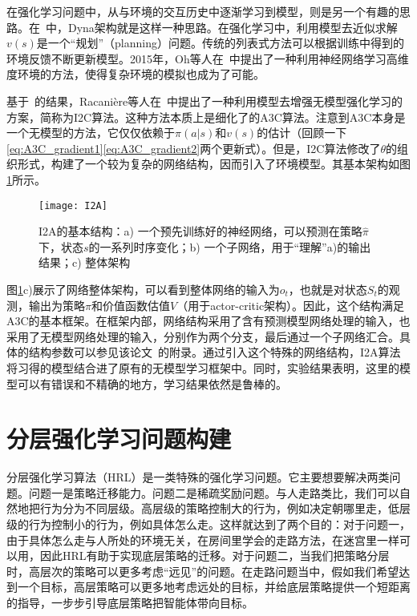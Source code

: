      在强化学习问题中，从与环境的交互历史中逐渐学习到模型，则是另一个有趣的思路。在~中，Dyna架构就是这样一种思路。在强化学习中，利用模型去近似求解$v(s)$是一个``规划''（planning）问题。传统的列表式方法可以根据训练中得到的环境反馈不断更新模型。2015年，Oh等人在~中提出了一种利用神经网络学习高维度环境的方法，使得复杂环境的模拟也成为了可能。\par 
      基于~\cite{action-conditional_prediction}的结果，Racani\`{e}re等人在~中提出了一种利用模型去增强无模型强化学习的方案，简称为I2C算法。这种方法本质上是细化了的A3C算法。注意到A3C本身是一个无模型的方法，它仅仅依赖于$\pi(a|s)$和$v(s)$的估计（回顾一下\eqref{eq:A3C_gradient1}\eqref{eq:A3C_gradient2}两个更新式）。但是，I2C算法修改了$\theta$的组织形式，构建了一个较为复杂的网络结构，因而引入了环境模型。其基本架构如图\ref{fig:I2A}所示。
      \begin{figure}[H] %
        \centering
        \texttt{[image: I2A]}
        \caption{I2A的基本结构：a) 一个预先训练好的神经网络，可以预测在策略$\hat{\pi}$下，状态$s$的一系列时序变化；b) 一个子网络，用于``理解''a)的输出结果；c) 整体架构}
        \label{fig:I2A}
      \end{figure}
      \par 图\ref{fig:I2A}c)展示了网络整体架构，可以看到整体网络的输入为$o_t$，也就是对状态$S_t$的观测，输出为策略$\pi$和价值函数估值$V$（用于actor-critic架构）。因此，这个结构满足A3C的基本框架。在框架内部，网络结构采用了含有预测模型网络处理的输入，也采用了无模型网络处理的输入，分别作为两个分支，最后通过一个子网络汇合。具体的结构参数可以参见该论文~\cite{I2A}的附录。通过引入这个特殊的网络结构，I2A算法将习得的模型结合进了原有的无模型学习框架中。同时，实验结果表明，这里的模型可以有错误和不精确的地方，学习结果依然是鲁棒的。
    
\section{分层强化学习问题构建}
分层强化学习算法（HRL）是一类特殊的强化学习问题。它主要想要解决两类问题。问题一是策略迁移能力。问题二是稀疏奖励问题。与人走路类比，我们可以自然地把行为分为不同层级。高层级的策略控制大的行为，例如决定朝哪里走，低层级的行为控制小的行为，例如具体怎么走。这样就达到了两个目的：对于问题一，由于具体怎么走与人所处的环境无关，在房间里学会的走路方法，在迷宫里一样可以用，因此HRL有助于实现底层策略的迁移。对于问题二，当我们把策略分层时，高层次的策略可以更多考虑``远见''的问题。在走路问题当中，假如我们希望达到一个目标，高层策略可以更多地考虑远处的目标，并给底层策略提供一个短距离的指导，一步步引导底层策略把智能体带向目标。

